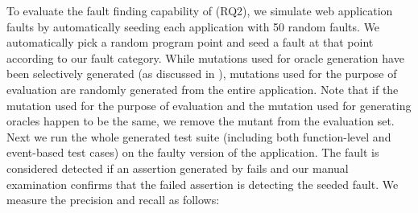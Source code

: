  \label{test-oracle-setup}
%
To evaluate the fault finding capability of \tool (RQ2), we simulate web application faults by automatically seeding each application with 50 random faults. %
We automatically pick a random program point and seed a fault at that point according to our fault category.
While mutations used for oracle generation have been selectively generated (as discussed in ), 
mutations used for the purpose of evaluation are randomly generated from the entire application. Note that if the mutation used for the purpose of evaluation and the mutation used for generating oracles happen to be the same, we remove the mutant from the evaluation set. 
%
Next we run the whole generated test suite (including both function-level and event-based test cases) on the faulty version of the application. The fault is considered detected if an assertion generated by \tool fails and our manual examination confirms that the failed assertion is detecting the seeded fault.
We measure the precision and recall as follows:

